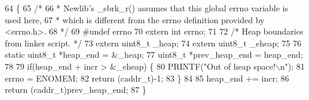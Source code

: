\begin{DoxyCode}
64 \{
65   \textcolor{comment}{/*}
66 \textcolor{comment}{   * Newlib's \_sbrk\_r() assumes that this global errno variable is used here,}
67 \textcolor{comment}{   * which is different from the errno definition provided by <errno.h>.}
68 \textcolor{comment}{   */}
69 \textcolor{preprocessor}{#undef errno}
70   \textcolor{keyword}{extern} \textcolor{keywordtype}{int} errno;
71 
72   \textcolor{comment}{/* Heap boundaries from linker script. */}
73   \textcolor{keyword}{extern} uint8\_t \_heap;
74   \textcolor{keyword}{extern} uint8\_t \_eheap;
75 
76   \textcolor{keyword}{static} uint8\_t *heap\_end = &\_heap;
77   uint8\_t *prev\_heap\_end = heap\_end;
78 
79   \textcolor{keywordflow}{if}(heap\_end + incr > &\_eheap) \{
80     PRINTF(\textcolor{stringliteral}{"Out of heap space!\(\backslash\)n"});
81     errno = ENOMEM;
82     \textcolor{keywordflow}{return} (caddr\_t)-1;
83   \}
84 
85   heap\_end += incr;
86   \textcolor{keywordflow}{return} (caddr\_t)prev\_heap\_end;
87 \}
\end{DoxyCode}
